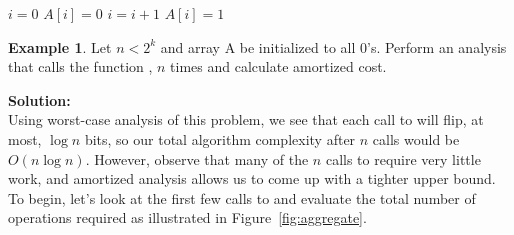 \documentclass[11pt]{article}
\theoremstyle{definition}
\newtheorem{exmp}{Example}[section]
\begin{document}
\begin{algorithm}
\caption{}\label{Inc}
\begin{algorithmic}[1]
\State $i=0$
    \State $A[i]=0$
    \State $i=i+1$
\EndWhile
{}
  \State $A[i]=1$
\EndIf
\end{algorithmic}
\end{algorithm}

\begin{exmp}
Let $n < 2^k$ and array A be initialized to all 0's.  Perform an analysis that calls the function , $n$ times and calculate amortized cost. 

\hspace{0.5cm} \textbf{Solution:}\\
Using worst-case analysis of this problem, we see that each call to  will flip, at most, $\log n$ bits, so our total
algorithm complexity after $n$ calls would be $O(n \log{n})$.  However, observe that
many of the $n$ calls to  require very little work, and amortized analysis allows us to come up with a tighter upper bound.  To begin, let's look at
the first few calls to  and evaluate the total number of operations required as illustrated in Figure~\ref{fig:aggregate}.


\end{exmp}
\end{document}
